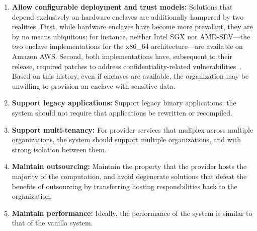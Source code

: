 \begin{enumerate}
    \item \textbf{Allow configurable deployment and trust models:}
        Solutions that depend exclusively on hardware enclaves are additionally
        hampered by two realities.
        First, while hardware enclaves have become more prevalant, they are by no means
        ubiquitous; for instance, neither Intel SGX nor AMD-SEV---the two enclave
        implementations for the x86\_64 architecture---are available on Amazon AWS\@.
        Second, both implementations have, subsequent to their release, required
        patches to address confidentiality-related vulnerabilities~\cite{foreshadow,
        amd-sev-unprotected-io, severed}.
        Based on this history, even if enclaves are available, the organization may be
        unwilling to provision an enclave with sensitive data.


    \item \textbf{Support legacy applications:} 
        Support legacy binary applications; the system should not require that
        applications be rewritten or recompiled.


    \item \textbf{Support multi-tenancy:} 
        For provider services that muliplex
        across multiple organizations, the system should support multiple
        organizations, and with strong isolation between them.


    \item \textbf{Maintain outsourcing:}
        Maintain the property that the provider hosts the majority of the computation,
        and avoid degenerate solutions that defeat the benefits of outsourcing by
        transferring hosting responsbilities back to the organization.


    \item \textbf{Maintain performance:}
        Ideally, the performance of the system is similar to that of the vanilla
        system.
\end{enumerate}
